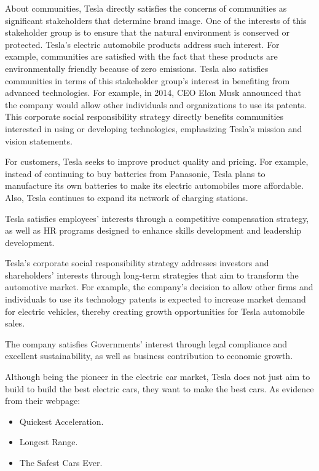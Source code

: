 \documentclass[12pt]{article}
\begin{document}
About communities, Tesla directly satisfies the concerns of communities as significant stakeholders that determine brand image. One of the interests of this stakeholder group is to ensure that the natural environment is conserved or protected. Tesla’s electric automobile products address such interest. For example, communities are satisfied with the fact that these products are environmentally friendly because of zero emissions. Tesla also satisfies communities in terms of this stakeholder group’s interest in benefiting from advanced technologies. For example, in 2014, CEO Elon Musk announced that the company would allow other individuals and organizations to use its patents. This corporate social responsibility strategy directly benefits communities interested in using or developing technologies, emphasizing Tesla’s mission and vision statements.

For customers, Tesla seeks to improve product quality and pricing. For example, instead of continuing to buy batteries from Panasonic, Tesla plans to manufacture its own batteries to make its electric automobiles more affordable. Also, Tesla continues to expand its network of charging stations.

Tesla satisfies employees' interests through a competitive compensation strategy, as well as HR programs designed to enhance skills development and leadership development.

Tesla’s corporate social responsibility strategy addresses investors and shareholders' interests through long-term strategies that aim to transform the automotive market. For example, the company’s decision to allow other firms and individuals to use its technology patents is expected to increase market demand for electric vehicles, thereby creating growth opportunities for Tesla automobile sales.

The company satisfies Governments' interest through legal compliance and excellent sustainability, as well as business contribution to economic growth.

Although being the pioneer in the electric car market, Tesla does not just aim to build to build the best electric cars, they want to make the best cars. As evidence from their webpage:

\begin{itemize}
	\item{Quickest Acceleration.}
	\item{Longest Range.}
	\item{The Safest Cars Ever.}
\end{itemize}
\end{document}
